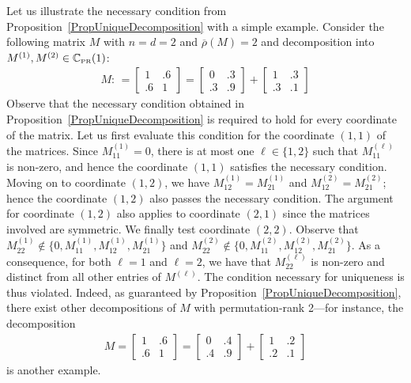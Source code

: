 \documentclass[11pt, hidelinks]{article} %
\newcommand{\defn}{\ensuremath{:\,=}}
\newcommand{\numrows}{n}
\newcommand{\numcols}{d}
\newcommand{\wtmatrix}{M}
\newcommand{\wt}{\wtmatrix}
\newcommand{\matrixset}{\mathbb{C}}
\newcommand{\permset}{\matrixset_{\mbox{\tiny PR}}}
\newcommand{\permone}{\permset(1)}
\newcommand{\permrank}{\rho}
\newcommand{\fnpermrank}[1]{\overline{\permrank}(#1)}
\begin{document}
Let us illustrate the necessary condition from
Proposition~\ref{PropUniqueDecomposition} with a simple
example. Consider the following matrix $\wt$ with $\numrows = \numcols
= 2$ and $\fnpermrank{\wt}=2$ and decomposition into $\wt^{(1)},
\wt^{(2)} \in \permone$:
\begin{align*}
\wt \defn
\begin{bmatrix}
1 & .6 \\ .6 & 1
\end{bmatrix}
=
\begin{bmatrix}
0 & .3 \\ .3 & .9
\end{bmatrix}
+
\begin{bmatrix}
1 & .3 \\ .3 & .1
\end{bmatrix}
\end{align*}
Observe that the necessary condition obtained in Proposition~\ref{PropUniqueDecomposition} is required to hold for every coordinate of the matrix. Let us
first evaluate this condition for the coordinate $(1,1)$ of the matrices. Since
$\wt^{(1)}_{11} = 0$, there is at most one $\ell \in \{1,2\}$ such
that $\wt^{(\ell)}_{11}$ is non-zero, and hence the coordinate $(1,1)$
satisfies the necessary condition. Moving on to coordinate $(1,2)$, we
have $\wt^{(1)}_{12} = \wt^{(1)}_{21}$ and $\wt^{(2)}_{12} = \wt^{(2)}_{21}$; hence the coordinate $(1,2)$ also
passes the necessary condition. The argument for coordinate $(1,2)$ also applies to
coordinate $(2,1)$ since the matrices involved are symmetric. We
finally test coordinate $(2,2)$. Observe that $\wt^{(1)}_{22} \notin
\{0,\wt^{(1)}_{11},\wt^{(1)}_{12},\wt^{(1)}_{21}\}$ and
$\wt^{(2)}_{22} \notin
\{0,\wt^{(2)}_{11},\wt^{(2)}_{12},\wt^{(2)}_{21}\}$. As a consequence,
for both $\ell = 1$ and $\ell = 2$, we have that $\wt^{(\ell)}_{22}$
is non-zero and distinct from all other entries of $\wt^{(\ell)}$. The
condition necessary for uniqueness is thus violated. Indeed, as
guaranteed by Proposition~\ref{PropUniqueDecomposition}, there exist
other decompositions of $\wt$ with permutation-rank 2---for instance, the decomposition
\begin{align*}
\wt =
%
\begin{bmatrix}
1 & .6 \\ .6 & 1
\end{bmatrix}
=
\begin{bmatrix}
0 & .4 \\
.4 & .9
\end{bmatrix}
+
\begin{bmatrix}
1 & .2 \\ .2 & .1
\end{bmatrix}
\end{align*}
is another example.
\end{document}
